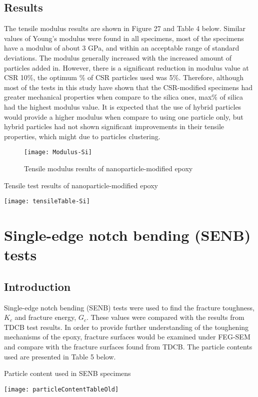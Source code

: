 \documentclass[numbers=noendperiod,chapterprefix=on]{icldt} %
\begin{document}
\subsection{Results}
The tensile modulus results are shown in Figure 27 and Table 4 below. Similar values of Young’s modulus were found in all specimens, most of the specimens have a modulus of about 3 GPa, and within an acceptable range of standard deviations. The modulus generally increased with the increased amount of particles added in. However, there is a significant reduction in modulus value at CSR 10\%, the optimum \% of CSR particles used was 5\%. Therefore, although most of the tests in this study have shown that the CSR-modified specimens had greater mechanical properties when compare to the silica ones, max\% of silica had the highest modulus value. It is expected that the use of hybrid particles would provide a higher modulus when compare to using one particle only, but hybrid particles had not shown significant improvements in their tensile properties, which might due to particles clustering.

\begin{figure}[!htpb]
\centering
\texttt{[image: Modulus-Si]}
\caption{Tensile modulus results of nanoparticle-modified epoxy } %
\end{figure}
\FloatBarrier
\begin{table}[!htpb]
\centering
\caption{Tensile test results of nanoparticle-modified epoxy} %
\texttt{[image: tensileTable-Si]}
\end{table}
\FloatBarrier
\section{Single-edge notch bending (SENB) tests}
\subsection{Introduction}
Single-edge notch bending (SENB) tests were used to find the fracture toughness, $K_c$ and fracture energy, $G_c$. These values were compared with the results from TDCB test results. In order to provide further understanding of the toughening mechanisms of the epoxy, fracture surfaces would be examined under FEG-SEM and compare with the fracture surfaces found from TDCB. The particle contents used are presented in Table 5 below.

\begin{table}[!htpb]
\centering
\caption{Particle content used in SENB specimens} %
\texttt{[image: particleContentTableOld]}
\end{table}
\FloatBarrier
\end{document}
